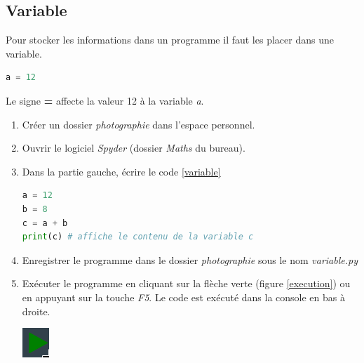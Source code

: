 \documentclass[a4paper,11pt]{article}
\begin{document}
\begin{Form}
\section{Variable}
Pour stocker les informations dans un programme il faut les placer dans une variable.
\begin{center}
\begin{lstlisting}[language=Python]
a = 12
\end{lstlisting}
\label{moncode}
\end{center}
\begin{aretenir}[]
Le signe \textbf{=} affecte la valeur 12 à la variable \emph{a}.
\end{aretenir}
\begin{activite}
\begin{enumerate}
\item Créer un dossier \emph{photographie} dans l'espace personnel.
\item Ouvrir le logiciel \emph{Spyder} (dossier \emph{Maths} du bureau).
\item Dans la partie gauche, écrire le code \ref{variable}
\begin{center}
\begin{lstlisting}[language=Python]
a = 12
b = 8
c = a + b
print(c) # affiche le contenu de la variable c
\end{lstlisting}
\label{variable}
\end{center}
\item Enregistrer le programme dans le dossier \emph{photographie} sous le nom \emph{variable.py}
\item Exécuter le programme en cliquant sur la flèche verte (figure \ref{execution}) ou en appuyant sur la touche \emph{F5}. Le code est exécuté dans la console en bas à droite.
\begin{center}
\centering
\includegraphics[width=1cm]{ressources/execution.png}
\label{execution}
\end{center}
\end{enumerate}
\end{activite}

\end{Form}
\end{document}
